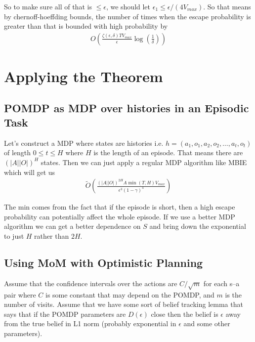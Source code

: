 \documentclass[10pt,english]{article}
\begin{document}
So to make sure all of that is $\leq \epsilon$, we should let $\epsilon_1 \leq \epsilon/(4V_{max})$. So that means by chernoff-hoeffding bounds, the number of times when the escape probability is greater than that is bounded with high probability by
\begin{align}
O\left(\frac{\zeta(\epsilon,\delta)TV_{max}}{\epsilon}\log\left(\frac{1}{\delta}\right)\right)
\end{align}

\section{Applying the Theorem}

\subsection{POMDP as MDP over histories in an Episodic Task}

Let's construct a MDP where states are histories i.e. $h=(a_1,o_1,a_2,o_2,\dots,a_t,o_t)$ of length $0\leq t \leq H$ where $H$ is the length of an episode. That means there are $(|A||O|)^H$ states. Then we can just apply a regular MDP algorithm like MBIE which will get us
\begin{align}
\tilde{O}\left( \frac{(|A||O|)^{2H}A\min(T,H)V_{max}}{\epsilon^3(1-\gamma)^4} \right)
\end{align}

The min comes from the fact that if the episode is short, then a high escape probability can potentially affect the whole episode. If we use a better MDP algorithm we can get a better dependence on $S$ and bring down the exponential to just $H$ rather than $2H$.

\subsection{Using MoM with Optimistic Planning}

Assume that the confidence intervals over the actions are $C/\sqrt{m}$ for each s--a pair where $C$ is some constant that may depend on the POMDP, and $m$ is the number of visits. Assume that we have some sort of belief tracking lemma that says that if the POMDP parameters are $D(\epsilon)$ close then the belief is $\epsilon$ away from the true belief in L1 norm (probably exponential in $\epsilon$ and some other parameters).
\end{document}

